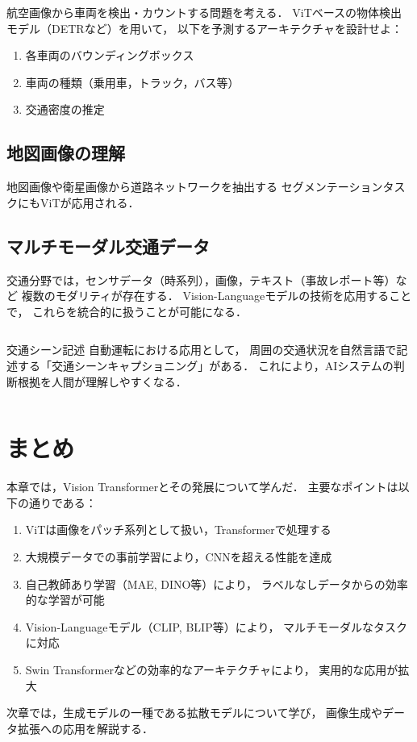 \begin{example}
  航空画像から車両を検出・カウントする問題を考える．
  ViTベースの物体検出モデル（DETR\cite{Carion2020}など）を用いて，
  以下を予測するアーキテクチャを設計せよ：
  \begin{enumerate}
    \item 各車両のバウンディングボックス
    \item 車両の種類（乗用車，トラック，バス等）
    \item 交通密度の推定
  \end{enumerate}
\end{example}

\subsection{地図画像の理解}

地図画像や衛星画像から道路ネットワークを抽出する
セグメンテーションタスクにもViTが応用される．

\subsection{マルチモーダル交通データ}

交通分野では，センサデータ（時系列），画像，テキスト（事故レポート等）など
複数のモダリティが存在する．
Vision-Languageモデルの技術を応用することで，
これらを統合的に扱うことが可能になる．

\begin{column}{交通シーン記述}
  自動運転における応用として，
  周囲の交通状況を自然言語で記述する「交通シーンキャプショニング」がある．
  これにより，AIシステムの判断根拠を人間が理解しやすくなる．
\end{column}

\section{まとめ}
\label{sec:vit-summary}

本章では，Vision Transformerとその発展について学んだ．
主要なポイントは以下の通りである：

\begin{enumerate}
  \item ViTは画像をパッチ系列として扱い，Transformerで処理する
  \item 大規模データでの事前学習により，CNNを超える性能を達成
  \item 自己教師あり学習（MAE, DINO等）により，
        ラベルなしデータからの効率的な学習が可能
  \item Vision-Languageモデル（CLIP, BLIP等）により，
        マルチモーダルなタスクに対応
  \item Swin Transformerなどの効率的なアーキテクチャにより，
        実用的な応用が拡大
\end{enumerate}

次章では，生成モデルの一種である拡散モデルについて学び，
画像生成やデータ拡張への応用を解説する．
